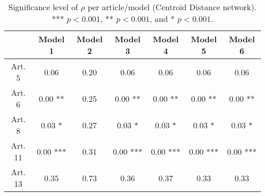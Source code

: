 \begin{table}[ht]
\centering
\begin{tabular}{ccccccc}
  \toprule
 & Model 1 & Model 2 & Model 3 & Model 4 & Model 5 & Model 6 \\ 
  \midrule
Art. 5 & 0.06   & 0.20   & 0.06   & 0.06   & 0.06   & 0.06   \\ 
   \midrule
Art. 6 & 0.00 ** & 0.25   & 0.00 ** & 0.00 ** & 0.00 ** & 0.00 ** \\ 
   \midrule
Art. 8 & 0.03 * & 0.27   & 0.03 * & 0.03 * & 0.03 * & 0.03 * \\ 
   \midrule
Art. 11 & 0.00 *** & 0.31   & 0.00 *** & 0.00 *** & 0.00 *** & 0.00 *** \\ 
   \midrule
Art. 13 & 0.35   & 0.73   & 0.36   & 0.37   & 0.33   & 0.33   \\ 
   \bottomrule
\end{tabular}
\caption{Significance level of $\rho$ per article/model (Centroid Distance network). *** $p < 0.001$, ** $p < 0.001$, and * $p < 0.001$.} 
\end{table}

